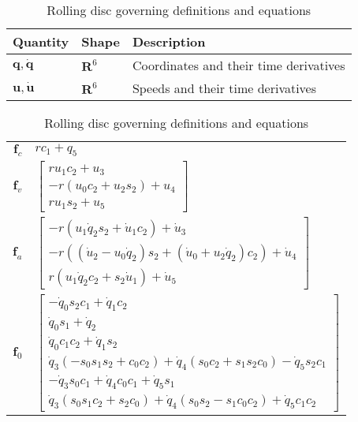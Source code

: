 \documentclass[smallcondensed]{svjour3}                     %
\begin{document}
\begin{table}[htbp]
  \centering
  \caption{Rolling disc governing definitions and equations}
  \label{table:rollingdisc}
  \begin{tabular}[c]{l l l}
    Quantity & Shape & Description\\
    \hline
    $\bm{q},\bm{\dot{q}}$ & $\mathbf{R}^6$ & Coordinates and their time
    derivatives\\
    $\bm{u}, \bm{\dot{u}}$ & $\mathbf{R}^6$ & Speeds and their time derivatives
  \end{tabular}
  \begin{tabular}[c]{r @{ $=$ } l}
    \hline
    $\bm{f}_c$ & $rc_1 + q_5$ \\
    $\bm{f}_v$ & $\left[\begin{array}{c}
        r u_1 c_2 + u_3 \\
        -r (u_0 c_2 + u_2 s_2) + u_4 \\
        r u_1 s_2 + u_5
    \end{array}\right] $ \\
    $\bm{f}_a$ & $\left[\begin{array}{c}
        -r (u_1 \dot{q}_2 s_2 + \dot{u}_1 c_2) + \dot{u}_3 \\
        -r ((\dot{u}_2 - u_0 \dot{q}_2) s_2   + (\dot{u}_0 + u_2 \dot{q}_2)c_2) + \dot{u}_4 \\
      r (u_1 \dot{q}_2 c_2 + s_2 \dot{u}_1) + \dot{u}_5
      \end{array}\right]$ \\
    $\bm{f}_0$ &
        $\left[\begin{array}{c}
-\dot{q}_0 s_2 c_1 + \dot{q}_1 c_2 \\
\dot{q}_0 s_1 + \dot{q}_2 \\
\dot{q}_0 c_1 c_2 + \dot{q}_1 s_2 \\
\dot{q}_3 (-s_0 s_1 s_2 + c_0 c_2)
+ \dot{q}_4 (s_0 c_2 + s_1 s_2 c_0)
- \dot{q}_5 s_2 c_1\\
- \dot{q}_3 s_0 c_1 + \dot{q}_4 c_0 c_1 + \dot{q}_5 s_1 \\
\dot{q}_3 (s_0s_1c_2 + s_2c_0) + \dot{q}_4 (s_0s_2 - s_1c_0c_2) + \dot{q}_5 c_1 c_2
         \end{array}\right]$ \\

\end{tabular}
\end{table}
\end{document}

